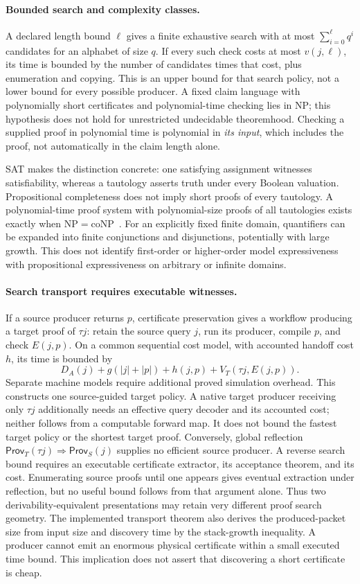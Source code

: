 \documentclass[11pt]{article}
\newcommand{\Prov}{\mathsf{Prov}}
\newcommand{\size}[1]{\lvert #1\rvert}
\begin{document}
\paragraph{Bounded search and complexity classes.}
A declared length bound $\ell$ gives a finite exhaustive search with
at most $\sum_{i=0}^{\ell}q^i$ candidates for an alphabet of size $q$.
If every such check costs at most $v(j,\ell)$, its time is bounded by
the number of candidates times that cost, plus enumeration and copying.
This is an upper bound for that search policy, not a lower bound for
every possible producer. A fixed claim language with polynomially short
certificates and polynomial-time checking lies in NP; this hypothesis
does not hold for unrestricted undecidable theoremhood. Checking a
supplied proof in polynomial time is polynomial in \emph{its input},
which includes the proof, not automatically in the claim length alone.

SAT makes the distinction concrete: one satisfying assignment witnesses
satisfiability, whereas a tautology asserts truth under every Boolean
valuation. Propositional completeness does not imply short proofs of every
tautology. A polynomial-time proof system with polynomial-size proofs of
all tautologies exists exactly when $\mathrm{NP}=\mathrm{coNP}$~\cite{cook}.
For an explicitly fixed finite domain, quantifiers can be expanded into
finite conjunctions and disjunctions, potentially with large growth. This
does not identify first-order or higher-order model expressiveness with
propositional expressiveness on arbitrary or infinite domains.

\paragraph{Search transport requires executable witnesses.}
If a source producer returns $p$, certificate preservation gives a
workflow producing a target proof of $\tau j$: retain the source query
$j$, run its producer, compile $p$, and check $E(j,p)$. On a common
sequential cost model, with accounted handoff cost $h$, its time is bounded by
\[
 D_A(j)+g(\size{j}+\size{p})+h(j,p)
       +V_T(\tau j,E(j,p)).
\]
Separate machine models require additional proved simulation overhead.
This constructs one source-guided target policy. A native target producer
receiving only $\tau j$ additionally needs an effective query decoder
and its accounted cost; neither follows from a computable forward map.
It does not bound the fastest target policy or the shortest target proof.
Conversely, global reflection
$\Prov_T(\tau j)\Rightarrow\Prov_S(j)$ supplies no efficient source
producer. A reverse search bound requires an executable certificate
extractor, its acceptance theorem, and its cost. Enumerating source
proofs until one appears gives eventual extraction under reflection,
but no useful bound follows from that argument alone. Thus two
derivability-equivalent presentations may retain very different proof
search geometry.
The implemented transport theorem also derives the produced-packet size
from input size and discovery time by the stack-growth inequality. A
producer cannot emit an enormous physical certificate within a small
executed time bound. This implication does not assert that discovering a
short certificate is cheap.
\end{document}
